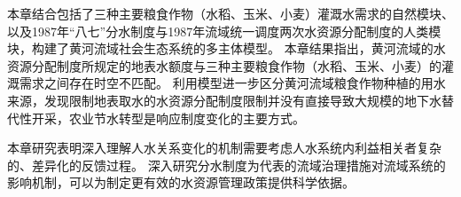 本章结合包括了三种主要粮食作物（水稻、玉米、小麦）灌溉水需求的自然模块、以及1987年``八七''分水制度与1987年流域统一调度两次水资源分配制度的人类模块，构建了黄河流域社会\textendash{}生态系统的多主体模型。
本章结果指出，黄河流域的水资源分配制度所规定的地表水额度与三种主要粮食作物（水稻、玉米、小麦）的灌溉需求之间存在时空不匹配。
利用模型进一步区分黄河流域粮食作物种植的用水来源，发现限制地表取水的水资源分配制度限制并没有直接导致大规模的地下水替代性开采，农业节水转型是响应制度变化的主要方式。

本章研究表明深入理解人\textendash{}水关系变化的机制需要考虑人\textendash{}水系统内利益相关者复杂的、差异化的反馈过程。
深入研究分水制度为代表的流域治理措施对流域系统的影响机制，可以为制定更有效的水资源管理政策提供科学依据。

